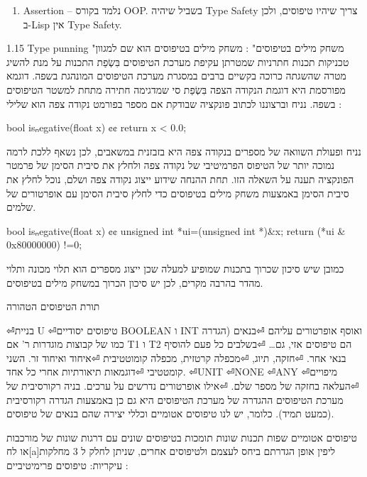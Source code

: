 \begin{טבלא}[!htbp]
\begin{enumerate}
      \item Assertion – נלמד בקורס OOP.
      בשביל שיהיה Type Safety צריך שיהיו טיפוסים, ולכן ב-Lisp אין Type Safety.
  \end{enumerate}

      1.15 Type punning "משחק מילים בטיפוסים" :
      משחק מילים בטיפוסים הוא שם למגוון טכניקות תכנות חתרניות שמטרתן עקיפת מערכת הטיפוסים בִּשְׂפַת התכנות על מנת להשיג מטרה שהשגתה כרוכה בקשיים ברבים במסגרת מערכת הטיפוסים המונהגת בשפה.
      דוגמא מפורסמת היא דוגמת הנקודה הצפה בִּשְׂפַת סי שמדגימה חתירה מתחת למשטר הטיפוסים בשפה.
      נניח וברצוננו לכתוב פונקציה שבודקת אם מספר בפורמט נקודה צפה הוא שלילי :
\begin{CPP}
bool isₙegative(float x) {¢¢
   return x < 0.0;
}
\end{CPP}
      נניח ופעולת השוואה של מספרים בנקודה צפה היא בזבזנית במשאבים, לכן נשאף ללכת לרמה נמוכה יותר של הטיפוס הפרמיטיבי של נקודה צפה ולחלץ את סיבית הסימן של פרמטר הפונקציה תענה על השאלה הזו. תחת ההנחה שידוע ייצוג נקודה צפה ושלם, נוכל לחלץ את סיבית הסימן באמצעות משחק מילים בטיפוסים כדי לחלץ סיבית הסימן עם אופרטורים של שלמים.
\begin{CPP}
bool isₙegative(float x) {¢¢
  unsigned int *ui=(unsigned int *)&x;
  return (*ui & 0x80000000) !=0;
}
\end{CPP}
      כמובן שיש סיכון שכרוך בתכנות שמופיע למעלה שכן ייצוג מספרים הוא תלוי מכונה ותלוי מהדר בהרבה מקרים, לכן יש סיכון הכרוך במשחק מילים בטיפוסים.

      תורת הטיפוסים הטהורה

⏎בניית U
⏎טיפוסים יסודיים BOOLEAN ו INT ואוסף אופרטורים עליהם
⏎בנאים (הגדרה כמו של קבוצות מוגדרות ר' אם T1 ו T2 הם טיפוסים אזי, גם…
⏎בשלבים כל פעם להוסיף בנאי אחר.
⏎חזקה, תיוג,
⏎מכפלה קרטזית, מכפלה קומוטטיבית
⏎איחוד ואיחוד זר. השני קומטטיבי
⏎דוגמאות תיאורתיות אחרי כל אחד.
⏎UNIT
⏎NONE
⏎ANY
⏎מיפויים
⏎העלאה בחזקה של מספר שלם.
⏎אילו אופרטורים נדרשים על ערכים.
      בניה רקורסיבית של מערכת הטיפוסים
      ההגדרה של מערכת הטיפוסים היא גם כן באמצעות הגדרה רקורסיבית (כמעט תמיד). כלומר, יש לנו טיפוסים אטומיים וכללי יצירה שהם בנאים של טיפוסים.

      טיפוסים אטומיים
      שפות תכנות שונות תומכות בטיפוסים שונים עם דרגות שונות של מורכבות או לח[a]ליפין אופן הגדרתם ביחס לעצמם ולטיפוסים אחרים, שניתן לחלק ל 3 מחלקות עיקריות:
      טיפוסים פרימיטיביים :


\end{טבלא}
